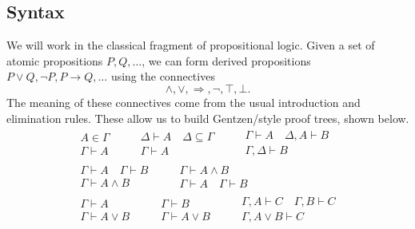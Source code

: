 \documentclass{../thesis-note}
\begin{document}
\subsection*{Syntax}

We will work in the classical fragment of propositional logic. Given a set of
atomic propositions \(P,Q,\ldots\), we can form derived propositions \(P \vee Q,
\neg P, P \to Q,\ldots\) using the connectives
\[%
  \wedge, \vee, \Rightarrow, \neg, \top, \bot.
\]%
The meaning of these connectives come from the usual introduction and
elimination rules. These allow us to build Gentzen\-/style proof trees, shown
below.
\begin{gather*}
  \begin{array}{c}
    A \in \Gamma \\\hline \Gamma \vdash A
  \end{array}\quad\quad
  \begin{array}{c}
    \Delta \vdash A \quad \Delta \subseteq \Gamma \\\hline \Gamma \vdash A
  \end{array}\quad\quad
  \begin{array}{c}
    \Gamma \vdash A \quad \Delta, A \vdash B\\\hline \Gamma,\Delta \vdash B
  \end{array}\\
  \begin{array}{c}
    \Gamma \vdash A \quad \Gamma \vdash B \\\hline \Gamma \vdash A \wedge B
  \end{array}\quad\quad
  \begin{array}{c}
    \Gamma \vdash A \wedge B \\\hline \Gamma \vdash A \quad \Gamma \vdash B
  \end{array}\\
  \begin{array}{c}
    \Gamma \vdash A \\\hline \Gamma \vdash A \vee B
  \end{array}\quad\quad
  \begin{array}{c}
    \Gamma \vdash B \\\hline \Gamma \vdash A \vee B
  \end{array}\quad\quad
  \begin{array}{c}
    \Gamma, A \vdash C \quad \Gamma, B \vdash C \\\hline \Gamma, A \vee B \vdash C
  \end{array}\\

\end{gather*}
\end{document}
